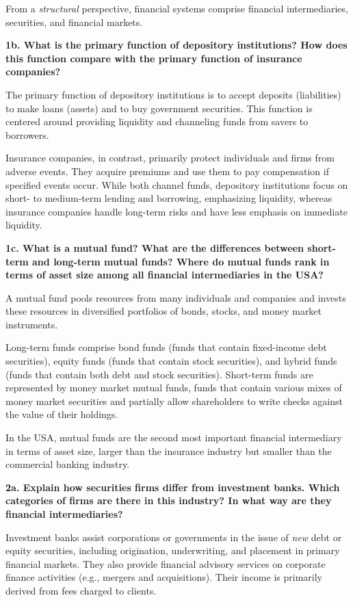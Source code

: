 \documentclass[twoside,openany]{book}
\begin{document}
From a \textit{structural} perspective, financial systems comprise financial intermediaries, securities, and financial markets.

\textbf{1b. What is the primary function of depository institutions? How does this function compare with the primary function of insurance companies?}

The primary function of depository institutions is to accept deposits (liabilities) to make loans (assets) and to buy government securities. This function is centered around providing liquidity and channeling funds from savers to borrowers.

Insurance companies, in contrast, primarily protect individuals and firms from adverse events. They acquire premiums and use them to pay compensation if specified events occur. While both channel funds, depository institutions focus on short- to medium-term lending and borrowing, emphasizing liquidity, whereas insurance companies handle long-term risks and have less emphasis on immediate liquidity.

\textbf{1c. What is a mutual fund? What are the differences between short-term and long-term mutual funds? Where do mutual funds rank in terms of asset size among all financial intermediaries in the USA?}

A mutual fund pools resources from many individuals and companies and invests these resources in diversified portfolios of bonds, stocks, and money market instruments.

Long-term funds comprise bond funds (funds that contain fixed-income debt securities), equity funds (funds that contain stock securities), and hybrid funds (funds that contain both debt and stock securities). Short-term funds are represented by money market mutual funds, funds that contain various mixes of money market securities and partially allow shareholders to write checks against the value of their holdings.

In the USA, mutual funds are the second most important financial intermediary in terms of asset size, larger than the insurance industry but smaller than the commercial banking industry.

\textbf{2a. Explain how securities firms differ from investment banks. Which categories of firms are there in this industry? In what way are they financial intermediaries?}

Investment banks assist corporations or governments in the issue of \textit{new} debt or equity securities, including origination, underwriting, and placement in primary financial markets. They also provide financial advisory services on corporate finance activities (e.g., mergers and acquisitions). Their income is primarily derived from fees charged to clients.
\end{document}
